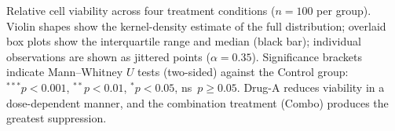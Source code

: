 \caption{Relative cell viability across four treatment conditions ($n=100$ per group).
Violin shapes show the kernel-density estimate of the full distribution; overlaid box plots show the interquartile range and median (black bar); individual observations are shown as jittered points ($\alpha=0.35$).
Significance brackets indicate Mann--Whitney $U$ tests (two-sided) against the Control group: $^{***}p<0.001$, $^{**}p<0.01$, $^{*}p<0.05$, ns~$p\geq0.05$.
Drug-A reduces viability in a dose-dependent manner, and the combination treatment (Combo) produces the greatest suppression.}
